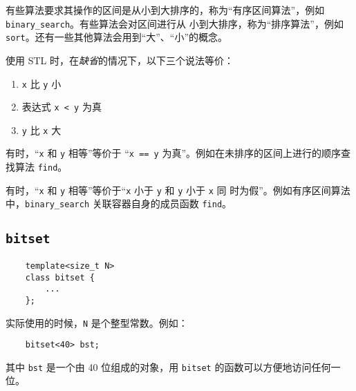 \documentclass[UTF8]{ctexart}
\begin{document}
有些算法要求其操作的区间是从小到大排序的，称为“有序区间算法”，例如 \texttt{binary\_search}。有些算法会对区间进行从
小到大排序，称为“排序算法”，例如 \texttt{sort}。还有一些其他算法会用到“大”、“小”的概念。

使用 STL 时，在\emph{缺省}的情况下，以下三个说法等价：
\begin{enumerate}
    \item \texttt{x} 比 \texttt{y} 小
    \item 表达式 \texttt{x < y} 为真
    \item \texttt{y} 比 \texttt{x} 大
\end{enumerate}

有时，“\texttt{x} 和 \texttt{y} 相等”等价于 “\texttt{x == y} 为真”。例如在未排序的区间上进行的顺序查找算法
\texttt{find}。

有时，“\texttt{x} 和 \texttt{y} 相等”等价于“\texttt{x} 小于 \texttt{y} 和 \texttt{y} 小于 \texttt{x} 同
时为假”。例如有序区间算法中，\texttt{binary\_search} 关联容器自身的成员函数 \texttt{find}。

\subsection{\texttt{bitset}}
\begin{verbatim}
    template<size_t N>
    class bitset {
        ...
    };
\end{verbatim}

实际使用的时候，\texttt{N} 是个整型常数。例如：
\begin{verbatim}
    bitset<40> bst;
\end{verbatim}
其中 \texttt{bst} 是一个由 40 位组成的对象，用 \texttt{bitset} 的函数可以方便地访问任何一位。
\end{document}
